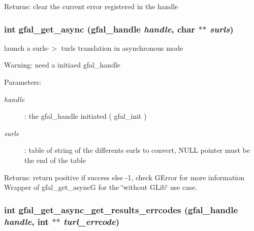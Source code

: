 \begin{Desc}
\item[Returns:]clear the current error registered in the handle \end{Desc}
\subsubsection{\setlength{\rightskip}{0pt plus 5cm}int gfal\_\-get\_\-async (gfal\_\-handle {\em handle}, char $\ast$$\ast$ {\em surls})}\label{gfal__common__interface_8h_68ef05f37b4971c8306b1cc6ee529647}


launch a surls-$>$ turls translation in asynchronous mode 

\begin{Desc}
\item[Warning:]need a initiaed gfal\_\-handle \end{Desc}
\begin{Desc}
\item[Parameters:]
\begin{description}
\item[{\em handle}]: the gfal\_\-handle initiated ( gfal\_\-init ) \item[{\em surls}]: table of string of the differents surls to convert, NULL pointer must be the end of the table \end{description}
\end{Desc}
\begin{Desc}
\item[Returns:]return positive if success else -1, check GError for more information Wrapper of gfal\_\-get\_\-async\-G for the \char`\"{}without GLib\char`\"{} use case. \end{Desc}
\subsubsection{\setlength{\rightskip}{0pt plus 5cm}int gfal\_\-get\_\-async\_\-get\_\-results\_\-errcodes (gfal\_\-handle {\em handle}, int $\ast$$\ast$ {\em turl\_\-errcode})}\label{gfal__common__interface_8h_a3161f12f9d5c8151f44df4f132602cb}


